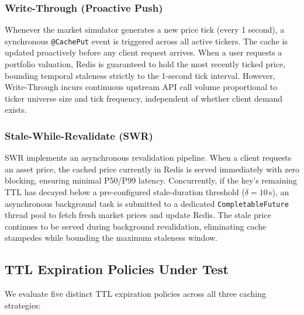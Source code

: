 \documentclass[11pt,a4paper]{article}
\begin{document}
\subsubsection{Write-Through (Proactive Push)}
Whenever the market simulator generates a new price tick (every 1 second), a synchronous \texttt{@CachePut} event is triggered across all active tickers. The cache is updated proactively before any client request arrives. When a user requests a portfolio valuation, Redis is guaranteed to hold the most recently ticked price, bounding temporal staleness strictly to the 1-second tick interval. However, Write-Through incurs continuous upstream API call volume proportional to ticker universe size and tick frequency, independent of whether client demand exists.

\subsubsection{Stale-While-Revalidate (SWR)}
SWR implements an asynchronous revalidation pipeline. When a client requests an asset price, the cached price currently in Redis is served immediately with zero blocking, ensuring minimal P50/P99 latency. Concurrently, if the key's remaining TTL has decayed below a pre-configured stale-duration threshold ($\delta = 10$\,s), an asynchronous background task is submitted to a dedicated \texttt{CompletableFuture} thread pool to fetch fresh market prices and update Redis. The stale price continues to be served during background revalidation, eliminating cache stampedes while bounding the maximum staleness window.

\subsection{TTL Expiration Policies Under Test}

We evaluate five distinct TTL expiration policies across all three caching strategies:
\end{document}
